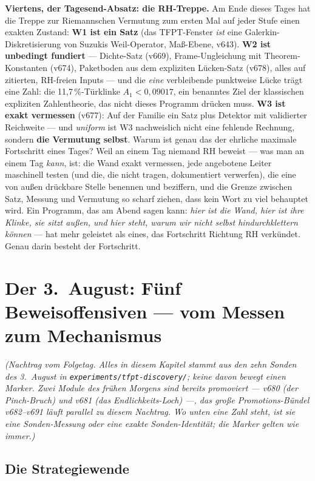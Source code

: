 \documentclass[11pt,a4paper]{article}
\begin{document}
\textbf{Viertens, der Tagesend-Absatz: die RH-Treppe.} Am Ende
dieses Tages hat die Treppe zur Riemannschen Vermutung zum ersten
Mal auf jeder Stufe einen exakten Zustand: \textbf{W1 ist ein
Satz} (das TFPT-Fenster \emph{ist} eine Galerkin-Diskretisierung
von Suzukis Weil-Operator, Maß-Ebene, v643). \textbf{W2 ist
unbedingt fundiert} --- Dichte-Satz (v669), Frame-Ungleichung mit
Theorem-Konstanten (v674), Paketboden aus dem expliziten
Lücken-Satz (v678), alles auf zitierten, RH-freien Inputs --- und
die \emph{eine} verbleibende punktweise Lücke trägt eine Zahl: die
11{,}7\,\%-Türklinke $A_1 < 0{,}09017$, ein benanntes Ziel der
klassischen expliziten Zahlentheorie, das nicht dieses Programm
drücken muss. \textbf{W3 ist exakt vermessen} (v677): Auf der
Familie ein Satz plus Detektor mit validierter Reichweite ---
und \emph{uniform} ist W3 nachweislich nicht eine fehlende
Rechnung, sondern \textbf{die Vermutung selbst}. Warum ist genau
das der ehrliche maximale Fortschritt eines Tages? Weil an einem
Tag niemand RH beweist --- was man an einem Tag \emph{kann}, ist:
die Wand exakt vermessen, jede angebotene Leiter maschinell testen
(und die, die nicht tragen, dokumentiert verwerfen), die eine von
außen drückbare Stelle benennen und beziffern, und die Grenze
zwischen \glqq{}Satz\grqq{}, \glqq{}Messung\grqq{} und
\glqq{}Vermutung\grqq{} so scharf ziehen, dass kein Wort zu viel
behauptet wird. Ein Programm, das am Abend sagen kann: \emph{hier
ist die Wand, hier ist ihre Klinke, sie sitzt außen, und hier
steht, warum wir nicht selbst hindurchklettern können} --- hat
mehr geleistet als eines, das \glqq{}Fortschritt Richtung
RH\grqq{} verkündet. Genau darin besteht der Fortschritt.

\clearpage
\section{Der 3.~August: Fünf Beweisoffensiven --- vom Messen zum
Mechanismus}
\label{sec:dritteraugust}

\emph{(Nachtrag vom Folgetag. Alles in diesem Kapitel stammt aus den
zehn Sonden des 3.~August in \texttt{experiments/tfpt-discovery/};
keine davon bewegt einen Marker. Zwei Module des frühen Morgens sind
bereits promoviert --- v680 (der Pinch-Bruch) und v681 (das
Endlichkeits-Loch) ---, das große Promotions-Bündel v682--v691 läuft
parallel zu diesem Nachtrag. Wo unten eine Zahl steht, ist sie eine
Sonden-Messung oder eine exakte Sonden-Identität; die Marker gelten
wie immer.)}

\subsection*{Die Strategiewende}
\end{document}
